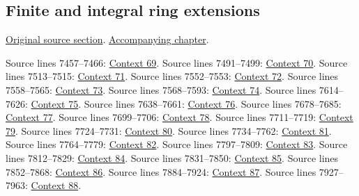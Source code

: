 \subsection{Finite and integral ring extensions}
\hypertarget{algebra-source-section-finite-ring-extensions}{}
\noindent\href{https://github.com/stacks/stacks-project/blob/a04446e57ec1fbc252a871afcec7752fb2807b14/algebra.tex\#L7434}{Original source section}. \href{algebra.pdf\#nameddest=section-finite-ring-extensions}{Accompanying chapter}.

\begin{AlgebraSourceRoutes}
 Source lines 7457--7466: \hyperlink{algebra-context-069}{Context 69}.
 Source lines 7491--7499: \hyperlink{algebra-context-070}{Context 70}.
 Source lines 7513--7515: \hyperlink{algebra-context-071}{Context 71}.
 Source lines 7552--7553: \hyperlink{algebra-context-072}{Context 72}.
 Source lines 7558--7565: \hyperlink{algebra-context-073}{Context 73}.
 Source lines 7568--7593: \hyperlink{algebra-context-074}{Context 74}.
 Source lines 7614--7626: \hyperlink{algebra-context-075}{Context 75}.
 Source lines 7638--7661: \hyperlink{algebra-context-076}{Context 76}.
 Source lines 7678--7685: \hyperlink{algebra-context-077}{Context 77}.
 Source lines 7699--7706: \hyperlink{algebra-context-078}{Context 78}.
 Source lines 7711--7719: \hyperlink{algebra-context-079}{Context 79}.
 Source lines 7724--7731: \hyperlink{algebra-context-080}{Context 80}.
 Source lines 7734--7762: \hyperlink{algebra-context-081}{Context 81}.
 Source lines 7764--7779: \hyperlink{algebra-context-082}{Context 82}.
 Source lines 7797--7809: \hyperlink{algebra-context-083}{Context 83}.
 Source lines 7812--7829: \hyperlink{algebra-context-084}{Context 84}.
 Source lines 7831--7850: \hyperlink{algebra-context-085}{Context 85}.
 Source lines 7852--7868: \hyperlink{algebra-context-086}{Context 86}.
 Source lines 7884--7924: \hyperlink{algebra-context-087}{Context 87}.
 Source lines 7927--7963: \hyperlink{algebra-context-088}{Context 88}.
\end{AlgebraSourceRoutes}

